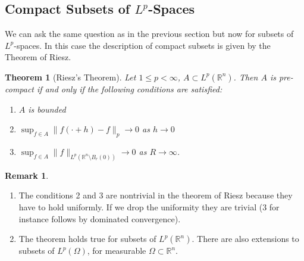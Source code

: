 \documentclass[11pt,a4paper]{article}
\newtheorem{thm}{Theorem}[section]
\theoremstyle{definition}
\newtheorem{rem}{Remark}[section]
\begin{document}
\subsection{Compact Subsets of $L^p$-Spaces}
We can ask the same question as in the previous section but now for subsets of $L^p$-spaces. In this case the description of compact subsets is given by the Theorem of Riesz.
\begin{thm}[Riesz's Theorem] Let $1 \leq p < \infty$, $A \subset L^p( \mathbb{R}^n)$. Then $A$ is pre-compact if and only if the following conditions are satisfied:
\begin{enumerate}
\item $A$ is bounded 
\item $\displaystyle \sup_{f \in A} \|f( \cdot + h) -f \|_p \to 0$ as $h \to 0$
\item $\displaystyle \sup_{f \in A} \|f\|_{L^p( \mathbb{R}^n \setminus B_r(0)) } \to 0$ as $R \to \infty$.
\end{enumerate}
\end{thm}
\begin{rem} \  \begin{enumerate}
\item The conditions 2 and 3 are nontrivial in the theorem of Riesz because they have to hold uniformly. If we drop the uniformity they are trivial (3 for instance follows by dominated convergence). 
\item The theorem holds true for subsets of $L^p( \mathbb{R}^n)$. There are also extensions to subsets of $L^p( \Omega)$, for measurable $\Omega \subset \mathbb{R}^n$. 
\end{enumerate} 
\end{rem}
\newpage
\end{document}
